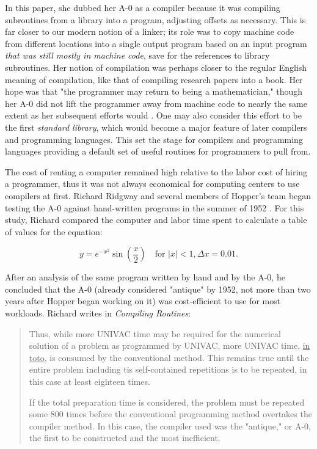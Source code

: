 In this paper, she dubbed her A-0 as a compiler because it was compiling subroutines from a
library into a program, adjusting offsets as necessary. This is far closer to
our modern notion of a linker; its role was to copy machine code from different
locations into a single output program based on an input program \textit{that
	was still mostly in machine code}, save for the references to library
subroutines. Her notion of compilation was perhaps closer to the regular
English meaning of compilation, like that of compiling research papers into a
book. Her hope was that "the programmer may return to being a mathematician,"
though her A-0 did not lift the programmer away from machine code to nearly the
same extent as her subsequent efforts would
\cite{education_of_a_computer_1952_hopper}.
One may also consider this effort
to be the first \textit{standard library}, which would become a major feature
of later compilers and programming languages. This set the stage for compilers
and programming languages providing a default set of useful routines for
programmers to pull from.

The cost of renting a computer remained high relative to the labor cost of
hiring a programmer, thus it was not always economical for computing centers to
use compilers at first. Richard Ridgway and several members of Hopper's team
began testing the A-0 against hand-written programs in the summer of 1952
\cite{ridgway_compiling_routines_1952}. For this study, Richard compared the
computer and labor time spent to calculate a table of values for the equation:

\[
	y = e^{-x^2} \sin\left(\frac{x}{2}\right)
	\quad \text{for } |x| < 1, \Delta x = 0.01.
\]

After an analysis of the same program written by hand and by the A-0, he
concluded that the A-0 (already considered "antique" by 1952, not more than two years
after Hopper began working on it) was cost-efficient to use for most workloads.
Richard writes in \textit{Compiling Routines}\cite{ridgway_compiling_routines_1952}:

\begin{quotation}
	Thus, while more UNIVAC time may be required for the numerical solution of a
	problem as programmed by UNIVAC, more UNIVAC time, \underline{in toto}, is
	consumed by the conventional method. This remains true until the entire problem
	including tis self-contained repetitions is to be repeated, in this case at
	least eighteen times.

	If the total preparation time is considered, the problem must be repeated some
	800 times before the conventional programming method overtakes the compiler
	method. In this case, the compiler used was the "antique," or A-0, the first to
	be constructed and the most inefficient.
\end{quotation}

